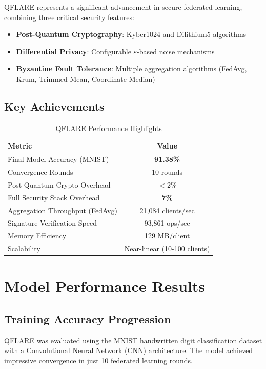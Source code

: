 \documentclass[12pt,a4paper]{article}
\begin{document}
QFLARE represents a significant advancement in secure federated learning, combining three critical security features:
\begin{itemize}
    \item \textbf{Post-Quantum Cryptography}: Kyber1024 and Dilithium5 algorithms
    \item \textbf{Differential Privacy}: Configurable $\varepsilon$-based noise mechanisms
    \item \textbf{Byzantine Fault Tolerance}: Multiple aggregation algorithms (FedAvg, Krum, Trimmed Mean, Coordinate Median)
\end{itemize}

\subsection{Key Achievements}

\begin{table}[H]
\centering
\caption{QFLARE Performance Highlights}
\begin{tabular}{lc}
\toprule
\textbf{Metric} & \textbf{Value} \\
\midrule
Final Model Accuracy (MNIST) & \textbf{91.38\%} \\
Convergence Rounds & 10 rounds \\
Post-Quantum Crypto Overhead & $<$2\% \\
Full Security Stack Overhead & \textbf{7\%} \\
Aggregation Throughput (FedAvg) & 21,084 clients/sec \\
Signature Verification Speed & 93,861 ops/sec \\
Memory Efficiency & 129 MB/client \\
Scalability & Near-linear (10-100 clients) \\
\bottomrule
\end{tabular}
\end{table}

\section{Model Performance Results}

\subsection{Training Accuracy Progression}

QFLARE was evaluated using the MNIST handwritten digit classification dataset with a Convolutional Neural Network (CNN) architecture. The model achieved impressive convergence in just 10 federated learning rounds.
\end{document}
